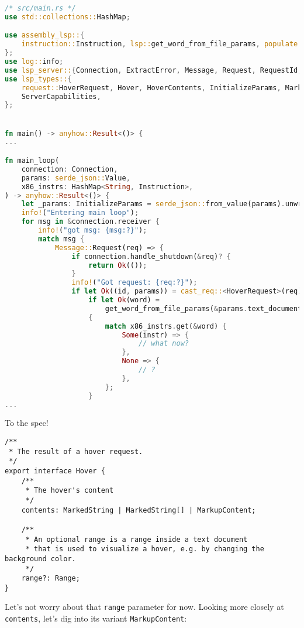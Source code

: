 \begin{lstlisting}[language=rust]
/* src/main.rs */
use std::collections::HashMap;

use assembly_lsp::{
    instruction::Instruction, lsp::get_word_from_file_params, populate::populate_instructions,
};
use log::info;
use lsp_server::{Connection, ExtractError, Message, Request, RequestId, Reponse};
use lsp_types::{
    request::HoverRequest, Hover, HoverContents, InitializeParams, MarkupContent, MarkupKind,
    ServerCapabilities,
};


fn main() -> anyhow::Result<()> {
...

fn main_loop(
    connection: Connection,
    params: serde_json::Value,
    x86_instrs: HashMap<String, Instruction>,
) -> anyhow::Result<()> {
    let _params: InitializeParams = serde_json::from_value(params).unwrap();
    info!("Entering main loop");
    for msg in &connection.receiver {
        info!("got msg: {msg:?}");
        match msg {
            Message::Request(req) => {
                if connection.handle_shutdown(&req)? {
                    return Ok(());
                }
                info!("Got request: {req:?}");
                if let Ok((id, params)) = cast_req::<HoverRequest>(req) {
                    if let Ok(word) =
                        get_word_from_file_params(&params.text_document_position_params)
                    {
                        match x86_instrs.get(&word) {
                            Some(instr) => {
                                // what now?
                            },
                            None => {
                                // ?
                            },
                        };
                    }
...
\end{lstlisting}

To the spec!

\begin{lstlisting}
/**
 * The result of a hover request.
 */
export interface Hover {
	/**
	 * The hover's content
	 */
	contents: MarkedString | MarkedString[] | MarkupContent;

	/**
	 * An optional range is a range inside a text document
	 * that is used to visualize a hover, e.g. by changing the background color.
	 */
	range?: Range;
}    
\end{lstlisting}

Let's not worry about that \texttt{range} parameter for now. Looking more closely at \texttt{contents}, let's dig into its variant \texttt{MarkupContent}:

